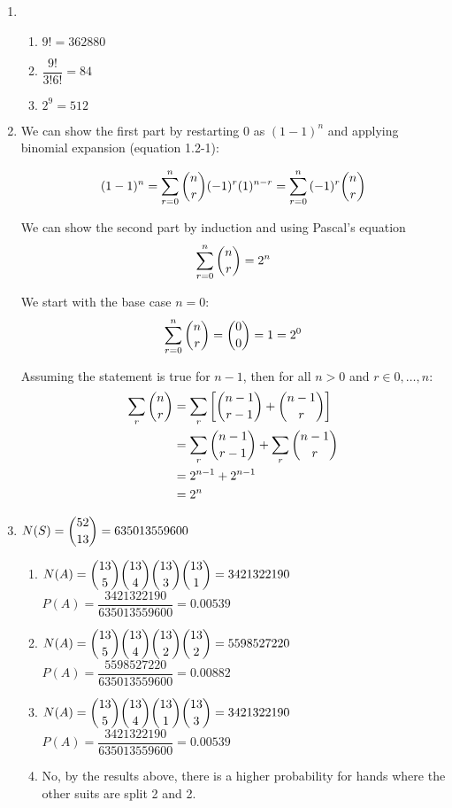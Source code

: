\documentclass{article}
\begin{document}
\begin{enumerate}
      \item 
	\begin{enumerate}
	 \item $9! = 362880$
	 \item $\dfrac{9!}{3!6!} = 84$
	 \item $2^9 = 512$
	\end{enumerate}

      \item 
	We can show the first part by restarting 0 as $(1-1)^n$ and applying binomial expansion
	(equation 1.2-1):
	
	\begin{align*}
	 (1 - 1)^n = \sum_{r=0}^n{\dbinom{n}{r}(-1)^r(1)^{n-r}} = \sum_{r=0}^n{(-1)^r\dbinom{n}{r}}
	\end{align*}
	
	We can show the second part by induction and using Pascal's equation
	$$ \sum_{r=0}^n{\dbinom{n}{r}} = 2^n $$
	
	We start with the base case $n = 0$:
	$$ \sum_{r = 0}^n{\dbinom{n}{r}} = \dbinom{0}{0} = 1 = 2^0 $$
	
	Assuming the statement is true for $n-1$, then for all $n > 0$ and $r \in {0,\dots,n}$:
	  \begin{align*}
	   \sum_{r}{\dbinom{n}{r}} &= \sum_{r}{\left[\dbinom{n-1}{r-1} + \dbinom{n-1}{r}\right]} \\
	    &= \sum_{r}{\dbinom{n-1}{r-1}} + \sum_{r}{\dbinom{n-1}{r}} \\
	    &= 2^{n-1} + 2^{n-1} \\
	    &= 2^n
	  \end{align*}
	
      \item 
	$N(S) = \dbinom{52}{13} = 635013559600$
	\begin{enumerate}
	 \item 
	    $N(A) = \dbinom{13}{5}\dbinom{13}{4}\dbinom{13}{3}\dbinom{13}{1} = 3421322190$ \\
	    $P(A) = \dfrac{3421322190}{635013559600} = 0.00539$
	 \item
	    $N(A) = \dbinom{13}{5}\dbinom{13}{4}\dbinom{13}{2}\dbinom{13}{2} = 5598527220$ \\
	    $P(A) = \dfrac{5598527220}{635013559600} = 0.00882$
	 \item
	    $N(A) = \dbinom{13}{5}\dbinom{13}{4}\dbinom{13}{1}\dbinom{13}{3} = 3421322190$ \\
	    $P(A) = \dfrac{3421322190}{635013559600} = 0.00539$
	 \item
	    No, by the results above, there is a higher probability for hands where the other
	    suits are split 2 and 2. 
	\end{enumerate}


\end{enumerate}
\end{document}
